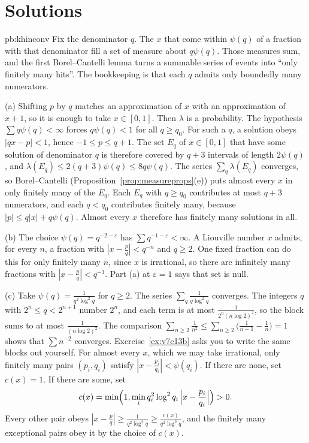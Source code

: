 \section*{Solutions}

\begin{solution}{pb:khinconv}
\idea Fix the denominator $q$. The $x$ that come within $\psi(q)$ of a fraction with that denominator fill a set of measure about $q\psi(q)$. Those measures sum, and the first Borel--Cantelli lemma turns a summable series of events into ``only finitely many hits''. The bookkeeping is that each $q$ admits only boundedly many numerators.

\writeup (a) Shifting $p$ by $q$ matches an approximation of $x$ with an approximation of $x+1$, so it is enough to take $x\in[0,1]$. Then $\lambda$ is a probability. The hypothesis $\sum q\psi(q)<\infty$ forces $q\psi(q)<1$ for all $q\ge q_0$. For such a $q$, a solution obeys $|qx-p|<1$, hence $-1\le p\le q+1$. The set $E_q$ of $x\in[0,1]$ that have some solution of denominator $q$ is therefore covered by $q+3$ intervals of length $2\psi(q)$, and $\lambda(E_q)\le 2(q+3)\psi(q)\le 8q\psi(q)$. The series $\sum_q\lambda(E_q)$ converges, so Borel--Cantelli (Proposition~\ref{prop:measureprops}(e)) puts almost every $x$ in only finitely many of the $E_q$. Each $E_q$ with $q\ge q_0$ contributes at most $q+3$ numerators, and each $q<q_0$ contributes finitely many, because $|p|\le q|x|+q\psi(q)$. Almost every $x$ therefore has finitely many solutions in all.

(b) The choice $\psi(q)=q^{-2-\varepsilon}$ has $\sum q^{-1-\varepsilon}<\infty$. A Liouville number $x$ admits, for every $n$, a fraction with $|x-\frac pq|<q^{-n}$ and $q\ge 2$. One fixed fraction can do this for only finitely many $n$, since $x$ is irrational, so there are infinitely many fractions with $|x-\frac pq|<q^{-3}$. Part (a) at $\varepsilon=1$ says that set is null.

(c) Take $\psi(q)=\frac1{q^2\log^2 q}$ for $q\ge 2$. The series $\sum_q\frac1{q\log^2 q}$ converges. The integers $q$ with $2^n\le q<2^{n+1}$ number $2^n$, and each term is at most $\frac1{2^n(n\log 2)^2}$, so the block sums to at most $\frac1{(n\log 2)^2}$. The comparison $\sum_{n\ge 2}\frac1{n^2}\le\sum_{n\ge 2}\bigl(\frac1{n-1}-\frac1n\bigr)=1$ shows that $\sum n^{-2}$ converges. Exercise~\ref{ex:v7c13b} asks you to write the same blocks out yourself. For almost every $x$, which we may take irrational, only finitely many pairs $(p_i,q_i)$ satisfy $|x-\frac{p_i}{q_i}|<\psi(q_i)$. If there are none, set $c(x)=1$. If there are some, set
\[
c(x)=\min\Bigl(1,\min_i q_i^2\log^2 q_i\,\Bigl|x-\frac{p_i}{q_i}\Bigr|\Bigr)>0.
\]
Every other pair obeys $|x-\frac pq|\ge\frac1{q^2\log^2 q}\ge\frac{c(x)}{q^2\log^2 q}$, and the finitely many exceptional pairs obey it by the choice of $c(x)$.


\end{solution}
